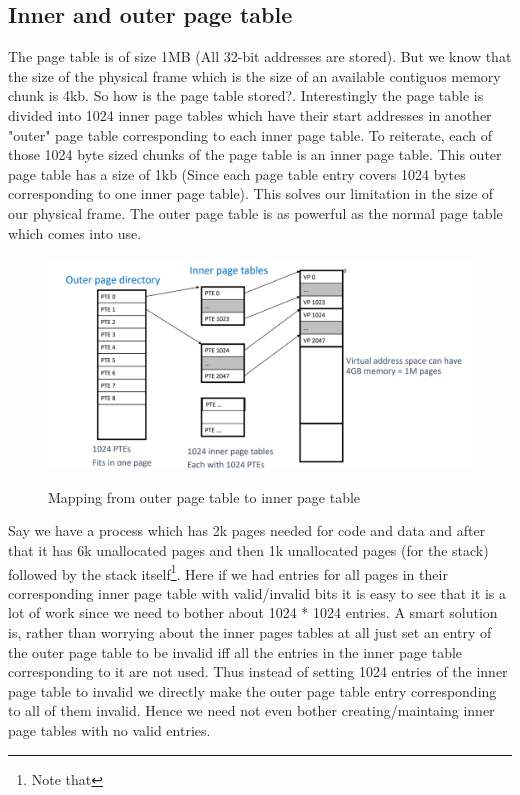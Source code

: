 \documentclass[12pt]{article}
\begin{document}
\subsection*{Inner and outer page table}
The page table is of size 1MB (All 32-bit addresses are stored). But we know that the size of the physical frame which is the size of an available contiguos memory chunk is 4kb. 
So how is the page table stored?. Interestingly the page table is divided into 1024 inner page tables which have their start addresses in another "outer" page table corresponding to each inner page table. To reiterate, each of those 1024 byte sized chunks of the page table is an inner page table.
This outer page table has a size of 1kb (Since each page table entry covers 1024 bytes corresponding to one inner page table). 
This solves our limitation in the size of our physical frame. The outer page table is as powerful as the normal page table which comes into use.


\begin{figure}[h]
    \begin{center}
        \hspace{2cm}
        \includegraphics[width = 12cm]{inner_page_table.png}
        \label{figure:inner_page_table}
        \caption{Mapping from outer page table to inner page table }
    \end{center}
\end{figure}

Say we have a process which has 2k pages needed for code and data and after that it has 6k unallocated pages and then 1k unallocated pages (for the stack) followed by the stack itself\footnote{Note that }.
Here if we had entries for all pages in their corresponding inner page table with valid/invalid bits it is easy to see that it is a lot of work since we need to bother about 1024 * 1024 entries. A smart solution is, rather
than worrying about the inner pages tables at all just set an entry of the outer page table to be invalid iff all the entries in the inner page table corresponding to it are not used. Thus instead of setting 1024 entries of the inner page 
table to invalid we directly make the outer page table entry corresponding to all of them invalid. Hence we need not even bother creating/maintaing inner page tables with no valid entries.
\end{document}
